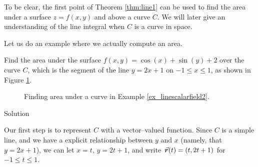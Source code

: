 To be clear, the first point of Theorem \ref{thm:line1} can be used to find the area under a surface $z=f(x,y)$ and above a curve $C$. We will later give an understanding of the line integral when $C$ is a curve in space.

Let us do an example where we actually compute an area.

\begin{example}\label{ex_linescalarfield2}
Find the area under the surface $f(x,y) =\cos(x)+\sin(y)+2$ over the curve $C$, which is the segment of the line $y=2x+1$ on $-1\leq x\leq 1$, as shown in Figure \ref{fig_Vector_Calc_2}.

\begin{figure}[H]
\centering
\qquad
{}
\caption{Finding area under a curve in Example \ref{ex_linescalarfield2}.}
\label{fig_Vector_Calc_2}
\end{figure}

\pagebreak
{}Solution 

Our first step is to represent $C$ with a vector--valued function. Since $C$ is a simple line, and we have a explicit relationship between $y$ and $x$ (namely, that $y=2x+1$), we can let $x = t$, $y = 2t+1$, and write $\vrt = \left( t, 2t+1\right)$ for $-1\leq t\leq 1$. 


\end{example}

